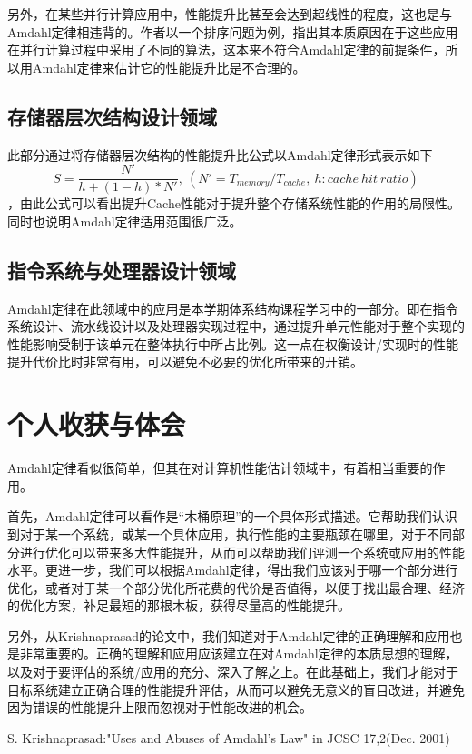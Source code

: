 \documentclass[a4paper,12pt]{article}
\begin{document}
\begin{CJK*}{UTF8}{song}
		另外，在某些并行计算应用中，性能提升比甚至会达到超线性的程度，这也是与Amdahl定律相违背的。作者以一个排序问题为例，指出其本质原因在于这些应用在并行计算过程中采用了不同的算法，这本来不符合Amdahl定律的前提条件，所以用Amdahl定律来估计它的性能提升比是不合理的。

		\subsection{存储器层次结构设计领域}
		\linespread{1.1}此部分通过将存储器层次结构的性能提升比公式以Amdahl定律形式表示如下\begin{displaymath}S=\frac{N'}{h+(1-h)*N'},\ (N'=T_{memory}/T_{cache},\ h:cache\ hit\ ratio)\end{displaymath}，由此公式可以看出提升Cache性能对于提升整个存储系统性能的作用的局限性。同时也说明Amdahl定律适用范围很广泛。

		\subsection{指令系统与处理器设计领域}
		\linespread{1.1}Amdahl定律在此领域中的应用是本学期体系结构课程学习中的一部分。即在指令系统设计、流水线设计以及处理器实现过程中，通过提升单元性能对于整个实现的性能影响受制于该单元在整体执行中所占比例。这一点在权衡设计/实现时的性能提升代价比时非常有用，可以避免不必要的优化所带来的开销。

	\section{\large{个人收获与体会}}
	\linespread{1.1}Amdahl定律看似很简单，但其在对计算机性能估计领域中，有着相当重要的作用。

	首先，Amdahl定律可以看作是“木桶原理”的一个具体形式描述。它帮助我们认识到对于某一个系统，或某一个具体应用，执行性能的主要瓶颈在哪里，对于不同部分进行优化可以带来多大性能提升，从而可以帮助我们评测一个系统或应用的性能水平。更进一步，我们可以根据Amdahl定律，得出我们应该对于哪一个部分进行优化，或者对于某一个部分优化所花费的代价是否值得，以便于找出最合理、经济的优化方案，补足最短的那根木板，获得尽量高的性能提升。

	另外，从Krishnaprasad的论文中，我们知道对于Amdahl定律的正确理解和应用也是非常重要的。正确的理解和应用应该建立在对Amdahl定律的本质思想的理解，以及对于要评估的系统/应用的充分、深入了解之上。在此基础上，我们才能对于目标系统建立正确合理的性能提升评估，从而可以避免无意义的盲目改进，并避免因为错误的性能提升上限而忽视对于性能改进的机会。

	\begin{thebibliography}{99}

			S. Krishnaprasad:"Uses and Abuses of Amdahl's Law" in JCSC 17,2(Dec. 2001)
	\end{thebibliography}

\end{CJK*}
\end{document}
